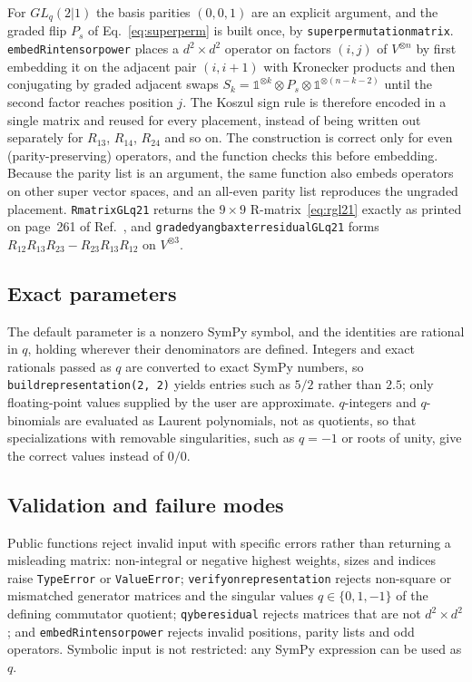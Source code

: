 \documentclass{SciPost}
\newcommand{\code}[1]{\texttt{\begingroup\def\_{\textunderscore\allowbreak}#1\endgroup}}
\newcommand{\GL}{GL_q(2|1)}
\begin{document}
For $\GL$ the basis parities $(0,0,1)$ are an explicit argument, and the graded flip $P_s$ of Eq.~\eqref{eq:superperm} is built once, by \code{super\_permutation\_matrix}. \code{embed\_R\_in\_tensor\_power} places a $d^2\times d^2$ operator on factors $(i,j)$ of $V^{\otimes n}$ by first embedding it on the adjacent pair $(i,i+1)$ with Kronecker products and then conjugating by graded adjacent swaps $S_k=\mathbb{1}^{\otimes k}\otimes P_s\otimes \mathbb{1}^{\otimes(n-k-2)}$ until the second factor reaches position $j$. The Koszul sign rule is therefore encoded in a single matrix and reused for every placement, instead of being written out separately for $R_{13}$, $R_{14}$, $R_{24}$ and so on. The construction is correct only for even (parity-preserving) operators, and the function checks this before embedding. Because the parity list is an argument, the same function also embeds operators on other super vector spaces, and an all-even parity list reproduces the ungraded placement. \code{R\_matrix\_GLq21} returns the $9\times9$ R-matrix~\eqref{eq:rgl21} exactly as printed on page~261 of Ref.~\cite{celik2021}, and \code{graded\_yang\_baxter\_residual\_GLq21} forms $R_{12}R_{13}R_{23}-R_{23}R_{13}R_{12}$ on $V^{\otimes3}$.

\subsection{Exact parameters}

The default parameter is a nonzero SymPy symbol, and the identities are rational in $q$, holding wherever their denominators are defined. Integers and exact rationals passed as $q$ are converted to exact SymPy numbers, so \code{build\_representation(2, 2)} yields entries such as $5/2$ rather than $2.5$; only floating-point values supplied by the user are approximate. $q$-integers and $q$-binomials are evaluated as Laurent polynomials, not as quotients, so that specializations with removable singularities, such as $q=-1$ or roots of unity, give the correct values instead of $0/0$.

\subsection{Validation and failure modes}

Public functions reject invalid input with specific errors rather than returning a misleading matrix: non-integral or negative highest weights, sizes and indices raise \code{TypeError} or \code{ValueError}; \code{verify\_on\_representation} rejects non-square or mismatched generator matrices and the singular values $q\in\{0,1,-1\}$ of the defining commutator quotient; \code{qybe\_residual} rejects matrices that are not $d^2\times d^2$; and \code{embed\_R\_in\_tensor\_power} rejects invalid positions, parity lists and odd operators. Symbolic input is not restricted: any SymPy expression can be used as $q$.
\end{document}
